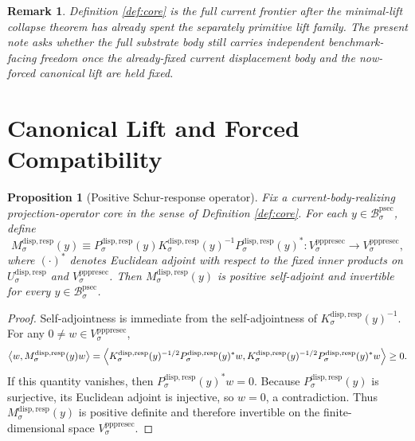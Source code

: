 \documentclass[11pt]{article}
\newcommand{\ProtoSectionBody}[1]{\mathcal B_{#1}^{\mathrm{psec}}}
\newcommand{\PrePreProtoSectionVertical}[1]{V_{#1}^{\mathrm{pppresec}}}
\newcommand{\SubstrateCarrier}[1]{U_{#1}^{\mathrm{disp,resp}}}
\newcommand{\SubstrateProjection}[1]{P_{#1}^{\mathrm{disp,resp}}}
\newcommand{\SubstrateOperator}[1]{K_{#1}^{\mathrm{disp,resp}}}
\newcommand{\SchurResponse}[1]{M_{#1}^{\mathrm{disp,resp}}}
\newtheorem{proposition}{Proposition}
\newtheorem{remark}{Remark}
\begin{document}
\begin{remark}
Definition \ref{def:core} is the full current frontier after the minimal-lift collapse theorem has already spent the separately primitive lift family. The present note asks whether the full substrate body still carries independent benchmark-facing freedom once the already-fixed current displacement body and the now-forced canonical lift are held fixed.
\end{remark}

\section{Canonical Lift and Forced Compatibility}

\begin{proposition}[Positive Schur-response operator]
\label{prop:schur}
Fix a current-body-realizing projection-operator core in the sense of Definition \ref{def:core}. For each \(y\in\ProtoSectionBody{\sigma}\), define
\[
\SchurResponse{\sigma}(y)
\equiv
\SubstrateProjection{\sigma}(y)
\SubstrateOperator{\sigma}(y)^{-1}
\SubstrateProjection{\sigma}(y)^*:
\PrePreProtoSectionVertical{\sigma}\to\PrePreProtoSectionVertical{\sigma},
\]
where \((\cdot)^*\) denotes Euclidean adjoint with respect to the fixed inner products on \(\SubstrateCarrier{\sigma}\) and \(\PrePreProtoSectionVertical{\sigma}\). Then \(\SchurResponse{\sigma}(y)\) is positive self-adjoint and invertible for every \(y\in\ProtoSectionBody{\sigma}\).
\end{proposition}

\begin{proof}
Self-adjointness is immediate from the self-adjointness of \(\SubstrateOperator{\sigma}(y)^{-1}\). For any \(0\neq w\in\PrePreProtoSectionVertical{\sigma}\),
\[
\ev{w,\SchurResponse{\sigma}(y)w}
=
\ev{
\SubstrateOperator{\sigma}(y)^{-1/2}\SubstrateProjection{\sigma}(y)^*w,
\SubstrateOperator{\sigma}(y)^{-1/2}\SubstrateProjection{\sigma}(y)^*w
}
\ge 0.
\]
If this quantity vanishes, then \(\SubstrateProjection{\sigma}(y)^*w=0\). Because \(\SubstrateProjection{\sigma}(y)\) is surjective, its Euclidean adjoint is injective, so \(w=0\), a contradiction. Thus \(\SchurResponse{\sigma}(y)\) is positive definite and therefore invertible on the finite-dimensional space \(\PrePreProtoSectionVertical{\sigma}\).
\end{proof}
\end{document}
